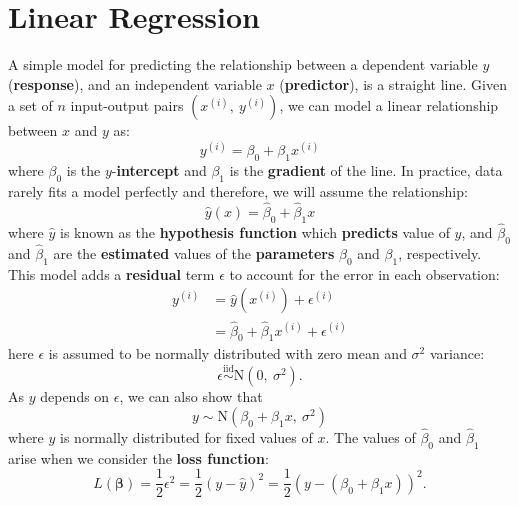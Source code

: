 \documentclass{article}
\begin{document}
\section{Linear Regression}
A simple model for predicting the relationship between a dependent
variable \(y\) (\textbf{response}), and an independent variable \(x\)
(\textbf{predictor}), is a straight line. Given a set of \(n\)
input-output pairs \(\left( x^{\left( i \right)},\: y^{\left( i
\right)} \right)\), we can model a linear relationship between \(x\)
and \(y\) as:
\begin{equation*}
    y^{\left( i \right)} = \beta_0 + \beta_1 x^{\left( i \right)}
\end{equation*}
where \(\beta_0\) is the \(y\)-\textbf{intercept} and \(\beta_1\) is the
\textbf{gradient} of the line. In practice, data rarely fits a model
perfectly and therefore, we will assume the relationship:
\begin{equation*}
    \hat{y}\left( x \right) = \hat{\beta}_0 + \hat{\beta}_1 x
\end{equation*}
where \(\hat{y}\) is known as the \textbf{hypothesis function} which
\textbf{predicts} value of \(y\), and \(\hat{\beta}_0\) and
\(\hat{\beta}_1\) are the \textbf{estimated} values of the
\textbf{parameters} \(\beta_0\) and \(\beta_1\), respectively. This
model adds a \textbf{residual} term \(\epsilon\) to account for the
error in each observation:
\begin{align*}
    y^{\left( i \right)} & = \hat{y}\left( x^{\left( i \right)} \right) + \epsilon^{\left( i \right)}         \\
                         & = \hat{\beta}_0 + \hat{\beta}_1 x^{\left( i \right)} + \epsilon^{\left( i \right)}
\end{align*}
here \(\epsilon\) is assumed to be normally distributed with zero mean
and \(\sigma^2\) variance:
\begin{equation*}
    \epsilon \overset{\mathrm{iid}}{\sim} \mathrm{N}\left( 0,\: \sigma^2 \right).
\end{equation*}
As \(y\) depends on \(\epsilon\), we can also show that
\begin{equation*}
    y \sim \mathrm{N}\left( \beta_0 + \beta_1 x,\: \sigma^2 \right)
\end{equation*}
where \(y\) is normally distributed for fixed values of \(x\).
The values of \(\hat{\beta}_0\) and \(\hat{\beta}_1\) arise when we
consider the \textbf{loss function}:
\begin{equation*}
    L\left( \symbf{\beta} \right) = \frac{1}{2} \epsilon^2 = \frac{1}{2} {\left( y - \hat{y} \right)}^2 = \frac{1}{2} {\left( y - \left( \beta_0 + \beta_1 x \right) \right)}^2.
\end{equation*}
\end{document}
